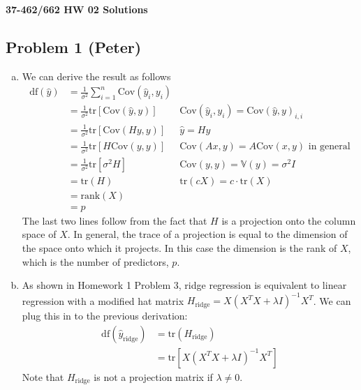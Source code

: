 \documentclass[12pt]{article}
\newcommand{\V}{\mathbb{V}}                         %
\renewcommand{\hat}{\widehat}
\newcommand{\1}{\mathbbm{1}}
\newcommand{\C}{\text{Cov}}
\begin{document}
\begin{center}
{\bf\Large 37-462/662 HW 02 Solutions}\\
\end{center}

\subsection{Problem 1 (Peter)}
\begin{enumerate}[(a)]
\item We can derive the result as follows
\begin{align*}
\text{df}(\hat y) &= \frac{1}{\sigma^2} \sum_{i=1}^n \C(\hat{y}_i,y_i) & \\
&= \frac{1}{\sigma^2} \text{tr}\left[\C(\hat{y},y)\right] & \C(\hat{y}_i,y_i)=\C(\hat{y},y)_{i,i}\\
&= \frac{1}{\sigma^2} \text{tr}\left[\C(Hy,y)\right] & \hat{y} = Hy\\
&= \frac{1}{\sigma^2} \text{tr}\left[H\C(y,y)\right] & \C(Ax,y) = A\C(x,y) \text{ in general}\\
&= \frac{1}{\sigma^2} \text{tr}\left[\sigma^2 H\right] & \C(y,y) = \V(y) = \sigma^2 I\\
&= \text{tr}(H) & \text{tr}(cX) = c\cdot\text{tr}(X)\\
&= \text{rank}(X) &\\
&= p &
\end{align*}
The last two lines follow from the fact that $H$ is a projection onto the column space of $X$. In general, the trace of a projection is equal to the dimension of the space onto which it projects. In this case the dimension is the rank of $X$, which is the number of predictors, $p$.
\item As shown in Homework 1 Problem 3, ridge regression is equivalent to linear regression with a modified hat matrix $H_{\text{ridge}} = X(X^TX+\lambda I)^{-1}X^T$. We can plug this in to the previous derivation:
\begin{align*}
\text{df}(\hat{y}_\text{ridge}) &= \text{tr}(H_\text{ridge}) \\
&=  \text{tr}\left[ X(X^TX+\lambda I)^{-1}X^T\right]
\end{align*}
Note that $H_\text{ridge}$ is not a projection matrix if $\lambda \neq 0$.
\end{enumerate}

\newpage
\end{document}
